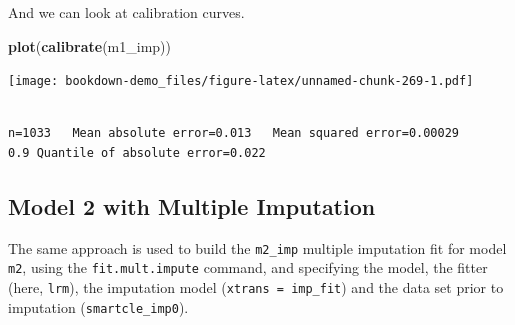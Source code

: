 \documentclass[]{book}
\newenvironment{Shaded}{\begin{snugshade}}{\end{snugshade}}
\newcommand{\KeywordTok}[1]{\textcolor[rgb]{0.13,0.29,0.53}{\textbf{#1}}}
\newcommand{\DataTypeTok}[1]{\textcolor[rgb]{0.13,0.29,0.53}{#1}}
\newcommand{\DecValTok}[1]{\textcolor[rgb]{0.00,0.00,0.81}{#1}}
\newcommand{\StringTok}[1]{\textcolor[rgb]{0.31,0.60,0.02}{#1}}
\newcommand{\OtherTok}[1]{\textcolor[rgb]{0.56,0.35,0.01}{#1}}
\newcommand{\OperatorTok}[1]{\textcolor[rgb]{0.81,0.36,0.00}{\textbf{#1}}}
\newcommand{\NormalTok}[1]{#1}
\theoremstyle{definition}
\theoremstyle{definition}
\theoremstyle{definition}
\theoremstyle{remark}
\begin{document}
And we can look at calibration curves.

\begin{Shaded}
\begin{Highlighting}[]
\KeywordTok{plot}\NormalTok{(}\KeywordTok{calibrate}\NormalTok{(m1_imp))}
\end{Highlighting}
\end{Shaded}

\texttt{[image: bookdown-demo\_files/figure-latex/unnamed-chunk-269-1.pdf]}

\begin{verbatim}

n=1033   Mean absolute error=0.013   Mean squared error=0.00029
0.9 Quantile of absolute error=0.022
\end{verbatim}

\subsection{Model 2 with Multiple
Imputation}\label{model-2-with-multiple-imputation}

The same approach is used to build the \texttt{m2\_imp} multiple
imputation fit for model \texttt{m2}, using the \texttt{fit.mult.impute}
command, and specifying the model, the fitter (here, \texttt{lrm}), the
imputation model (\texttt{xtrans\ =\ imp\_fit}) and the data set prior
to imputation (\texttt{smartcle\_imp0}).

\begin{Shaded}
\end{Shaded}
\end{document}
